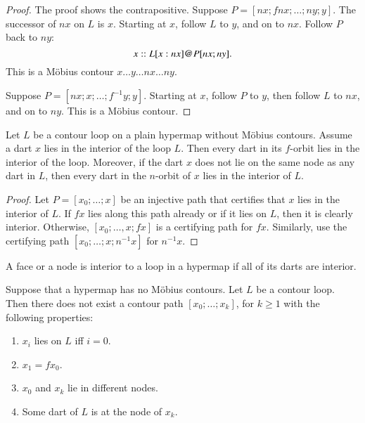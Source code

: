 \begin{proof}   The proof shows the contrapositive.   Suppose $P=[n x;f n x;\ldots;n y;y]$.   The successor of $n x$ on $L$ is $x$.  Starting at $x$,  follow $L$ to $y$, and on to $n x$.  Follow $P$ back to $n y$:
$$
x::L[x:n x] {\operatorname{@}} P[ n x;ny].
$$  
This is a M\"obius contour $x\ldots y\ldots n x\ldots n y$.

Suppose $P=[n x;x;\ldots;f^{-1} y;y]$.  Starting at $x$, follow $P$ to $y$, then follow $L$ to $n x$, and  on to $n y$.  This is a M\"obius contour.
\end{proof}

\begin{lemma}
Let $L$ be a contour loop on a plain hypermap without
M\"obius contours.  Assume a dart $x$ lies in the interior of the loop $L$. 
Then every dart in its $f$-orbit lies in
the interior of the loop.  Moreover, if the dart
$x$ does not lie on the same node as any dart in $L$, then every
dart in the $n$-orbit of $x$ lies in the interior 
of $L$.
\end{lemma}

\begin{proof} Let $P= [x_0;\ldots;x]$ be an injective path that certifies that $x$ lies in the interior of $L$.  If $f x$ lies along this path already or if it lies on $L$, then it is clearly interior.  Otherwise, $[x_0;\ldots,x;f x]$ is a certifying path for $f x$.  Similarly, use the certifying path $[x_0;\ldots;x;n^{-1} x]$ for $n^{-1} x$.
\end{proof}


\begin{definition}  A face or a node is interior to a
loop in a hypermap if all of its darts are interior.
\end{definition}


\begin{lemma}
Suppose that a hypermap has no M\"obius contours.  Let $L$ be a contour loop.
Then there does not exist a contour path
$[x_0;\ldots;x_k]$, for $k\ge 1$ with the following properties:
\begin{enumerate}
\item $x_i$ lies on $L$ iff $i=0$.
\item $x_1 = f x_0$.
\item $x_0$ and $x_k$ lie in different nodes.
\item Some dart of $L$ is at the node of $x_k$.
\end{enumerate}
\end{lemma}

